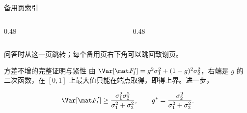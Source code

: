 
\begin{frame}[label=bk:index]{备用页索引}
  \begin{columns}[T, onlytextwidth]
    \begin{column}{0.48\textwidth}
    \end{column}
    \begin{column}{0.48\textwidth}
    \end{column}
  \end{columns}
  \vfill
  {\footnotesize\color{AcadMuted}
   问答时从这一页跳转；每个备用页右下角可以跳回致谢页。}
\end{frame}


\begin{frame}[label=bk:proof]{方差不增的完整证明与紧性}
  由 $\Var[\featmap_l'] = g^2\sigma_1^2 + (1-g)^2\sigma_2^2$，右端是 $g$ 的
  二次函数，在 $[0,1]$ 上最大值只能在端点取得，即得上界。进一步，

  \begin{equation*}
    \Var\!\left[\featmap_l'\right]
      \ge \frac{\sigma_1^2\sigma_2^2}{\sigma_1^2+\sigma_2^2},
    \qquad
    g^{*} = \frac{\sigma_2^2}{\sigma_1^2+\sigma_2^2}.
  \end{equation*}

\end{frame}

